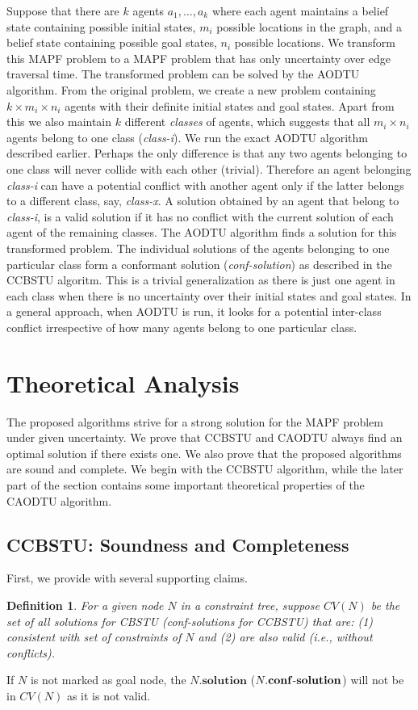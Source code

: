 \documentclass{article}
\newtheorem{definition}{Definition}
\begin{document}
{Suppose that there are $k$ agents $a_1, \ldots, a_k$ where each agent maintains a belief state containing possible initial states, $m_i$ possible locations in the graph, and a belief state containing possible goal states, $n_i$ possible locations. 
We transform this MAPF problem to a MAPF problem that has only uncertainty over edge traversal time. The transformed problem can be solved by the AODTU algorithm. 
From the original problem, we create a new problem containing $k \times m_i \times n_i$ agents with their definite initial states and goal states. 
Apart from this we also maintain $k$ different \emph{classes} of agents, which suggests that all $m_i \times n_i$ agents belong to one class (\emph{class-i}). We run the exact AODTU algorithm described earlier. 
Perhaps the only difference is that any two agents belonging to one class will never collide with each other (trivial). 
Therefore an agent belonging \emph{class-i} can have a potential conflict with another agent only if the latter belongs to a different class, say, \emph{class-x}. 
A solution obtained by an agent that belong to \emph{class-i}, is a valid solution if it has no conflict with the current solution of each agent of the remaining classes.  
The AODTU algorithm finds a solution for this transformed problem. The individual solutions of the agents belonging to one particular class form a conformant solution (\emph{conf-solution}) as described in the CCBSTU algoritm. 
This is a trivial generalization as there is just one agent in each class when there is no uncertainty over their initial states and goal states. In a general approach, when AODTU is run, it looks for a potential inter-class conflict irrespective of how many agents belong to one particular class.

\section{Theoretical Analysis}
The proposed algorithms strive for a strong solution for the MAPF problem under given uncertainty. We prove that CCBSTU and CAODTU always find an optimal solution if there exists one. We also prove that the proposed algorithms are sound and complete. 
We begin with the CCBSTU algorithm, while the later part of the section contains some important theoretical properties of the CAODTU algorithm.

\subsection{CCBSTU: Soundness and Completeness}
First, we provide with several supporting claims.
\begin{definition}
For a given node $N$ in a constraint tree, suppose $CV(N)$ be the set of all solutions for CBSTU (conf-solutions for CCBSTU) that are: (1) consistent with set of constraints of $N$ and (2) are also valid (i.e., without conflicts). 
\end{definition}
If $N$ is not marked as goal node, the $N.\mathbf{solution}$ ($N.\mathbf{conf\textnormal{-}solution}$) will not be in $CV(N)$ as it is not valid.

}
\end{document}
